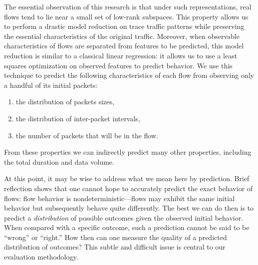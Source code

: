 \documentclass[conference]{IEEEtran}
\begin{document}
The essential observation of this research is that under such representations, real flows tend to lie near a small set of low-rank subspaces.
This property allows us to perform a drastic model reduction on trace traffic patterns while preserving the essential characteristics of the original traffic.
Moreover, when observable characteristics of flows are separated from features to be predicted, this model reduction is similar to a classical linear regression:
it allows us to use a least squares optimization on observed features to predict behavior.
We use this technique to predict the following characteristics of each flow from observing only a handful of its initial packets:
\begin{enumerate}
  \item the distribution of packets sizes,
  \item the distribution of inter-packet intervals,
  \item the number of packets that will be in the flow.
\end{enumerate}
From these properties we can indirectly predict many other properties, including the total duration and data volume.

At this point, it may be wise to address what we mean here by prediction.
Brief reflection shows that one cannot hope to accurately predict the exact behavior of flows:
flow behavior is nondeterministic---flows may exhibit the same initial behavior but subsequently behave quite differently.
The best we can do then is to predict a \emph{distribution} of possible outcomes given the observed initial behavior.
When compared with a specific outcome, such a prediction cannot be said to be ``wrong'' or ``right.''
How then can one measure the quality of a predicted distribution of outcomes?
This subtle and difficult issue is central to our evaluation methodology.


\end{document}
